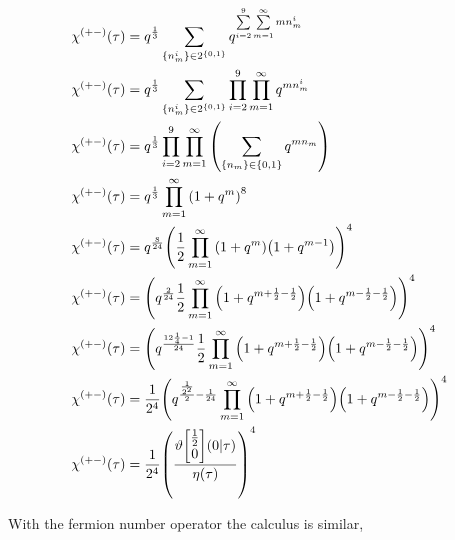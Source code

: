 \begin{align*}
    \chi^{(+-)}\qty(\tau)&=q^{\frac13}\sum\limits_{\qty{n_m^i}\in 2^{\qty{0,1}}}q^{\sum\limits_{i=2}^9\sum\limits_{m=1}^\infty mn_m^i} \\
    \chi^{(+-)}\qty(\tau)&=q^{\frac13}\sum\limits_{\qty{n_m^i}\in 2^{\qty{0,1}}}\prod\limits_{i=2}^9\prod\limits_{m=1}^\infty q^{ mn_m^i} \\
    \chi^{(+-)}\qty(\tau)&=q^{\frac13}\prod\limits_{i=2}^9\prod\limits_{m=1}^\infty\qty(\sum\limits_{\qty{n_m}\in\qty{0,1}} q^{ mn_m} )\\
    \chi^{(+-)}\qty(\tau)&=q^{\frac13}\prod\limits_{m=1}^\infty\qty(1+q^m )^8\\
    \chi^{(+-)}\qty(\tau)&=q^{\frac{8}{24}}\qty(\frac12\prod\limits_{m=1}^\infty\qty(1+q^m )\qty(1+q^{m-1} ))^4\\
    \chi^{(+-)}\qty(\tau)&=\qty(q^{\frac{2}{24}}\frac12\prod\limits_{m=1}^\infty\qty(1+q^{m+\frac12-\frac12} )\qty(1+q^{m-\frac12-\frac12} ))^4\\
    \chi^{(+-)}\qty(\tau)&=\qty(q^{\frac{12\frac14-1}{24}}\frac12\prod\limits_{m=1}^\infty\qty(1+q^{m+\frac12-\frac12} )\qty(1+q^{m-\frac12-\frac12} ))^4\\
    \chi^{(+-)}\qty(\tau)&=\frac{1}{2^4}\qty(q^{\frac{\frac{1}{2^2}}{2}-\frac{1}{24}}\prod\limits_{m=1}^\infty\qty(1+q^{m+\frac12-\frac12} )\qty(1+q^{m-\frac12-\frac12} ))^4\\
    \chi^{(+-)}\qty(\tau)&=\frac{1}{2^4}\qty(\frac{\vartheta\mqty[\frac12\\ 0]\qty(0|\tau)}{\eta\qty(\tau)})^4
\end{align*}

\probitem{}

With the fermion number operator the calculus is similar,

